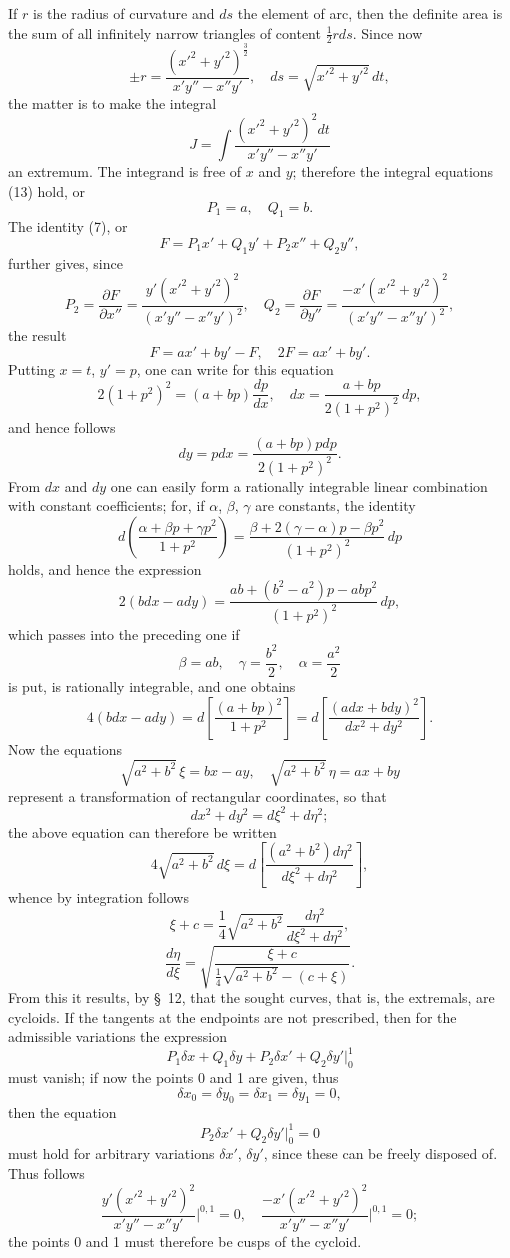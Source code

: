 \documentclass[11pt,a4paper,leqno]{article}
\begin{document}
If $r$ is the radius of curvature and $ds$ the element of arc, then the definite area is the sum of all infinitely narrow triangles of content $\frac12 rds$. Since now
\[
\pm r=\frac{(x'^2+y'^2)^{\frac32}}{x'y''-x''y'},\quad ds=\sqrt{x'^2+y'^2}\,dt,
\]
the matter is to make the integral
\[
J=\int\frac{(x'^2+y'^2)^2dt}{x'y''-x''y'}
\]
an extremum. The integrand is free of $x$ and $y$; therefore the integral equations (13) hold, or
\[
P_1=a,\quad Q_1=b.
\]
The identity (7), or
\[
F=P_1x'+Q_1y'+P_2x''+Q_2y'',
\]
further gives, since
\[
P_2=\frac{\partial F}{\partial x''}=\frac{y'(x'^2+y'^2)^2}{(x'y''-x''y')^2},\quad
Q_2=\frac{\partial F}{\partial y''}=\frac{-x'(x'^2+y'^2)^2}{(x'y''-x''y')^2},
\]
the result
\[
F=ax'+by'-F,\quad 2F=ax'+by'.
\]
Putting $x=t$, $y'=p$, one can write for this equation
\[
2(1+p^2)^2=(a+bp)\frac{dp}{dx},\quad dx=\frac{a+bp}{2(1+p^2)^2}\,dp,
\]
and hence follows
\[
dy=pdx=\frac{(a+bp)pdp}{2(1+p^2)^2}.
\]
From $dx$ and $dy$ one can easily form a rationally integrable linear combination with constant coefficients; for, if $\alpha$, $\beta$, $\gamma$ are constants, the identity
\[
d\left(\frac{\alpha+\beta p+\gamma p^2}{1+p^2}\right)
=\frac{\beta+2(\gamma-\alpha)p-\beta p^2}{(1+p^2)^2}\,dp
\]
holds, and hence the expression
\[
2(bdx-ady)=\frac{ab+(b^2-a^2)p-abp^2}{(1+p^2)^2}\,dp,
\]
which passes into the preceding one if
\[
\beta=ab,\quad \gamma=\frac{b^2}{2},\quad \alpha=\frac{a^2}{2}
\]
is put, is rationally integrable, and one obtains
\[
4(bdx-ady)=d\left[\frac{(a+bp)^2}{1+p^2}\right]
=d\left[\frac{(adx+bdy)^2}{dx^2+dy^2}\right].
\]
Now the equations
\[
\sqrt{a^2+b^2}\,\xi=bx-ay,
\quad
\sqrt{a^2+b^2}\,\eta=ax+by
\]
represent a transformation of rectangular coordinates, so that
\[
dx^2+dy^2=d\xi^2+d\eta^2;
\]
the above equation can therefore be written
\[
4\sqrt{a^2+b^2}\,d\xi=d\left[\frac{(a^2+b^2)d\eta^2}{d\xi^2+d\eta^2}\right],
\]
whence by integration follows
\[
\xi+c=\frac14\sqrt{a^2+b^2}\,\frac{d\eta^2}{d\xi^2+d\eta^2},
\]
\[
\frac{d\eta}{d\xi}=\sqrt{\frac{\xi+c}{\frac14\sqrt{a^2+b^2}-(c+\xi)}}.
\]
From this it results, by \S~12, that the sought curves, that is, the extremals, are cycloids. If the tangents at the endpoints are not prescribed, then for the admissible variations the expression
\[
P_1\delta x+Q_1\delta y+P_2\delta x'+Q_2\delta y'\bigg|_0^1
\]
must vanish; if now the points 0 and 1 are given, thus
\[
\delta x_0=\delta y_0=\delta x_1=\delta y_1=0,
\]
then the equation
\[
P_2\delta x'+Q_2\delta y'\bigg|_0^1=0
\]
must hold for arbitrary variations $\delta x'$, $\delta y'$, since these can be freely disposed of. Thus follows
\[
\frac{y'(x'^2+y'^2)^2}{x'y''-x''y'}\bigg|^{0,1}=0,
\quad
\frac{-x'(x'^2+y'^2)^2}{x'y''-x''y'}\bigg|^{0,1}=0;
\]
the points 0 and 1 must therefore be cusps of the cycloid.
\end{document}
